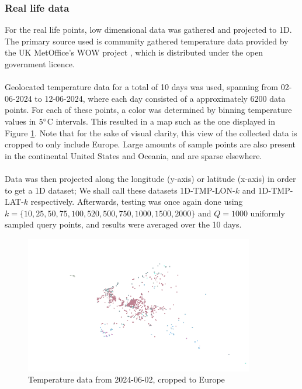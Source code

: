 \documentclass{article}
\begin{document}
\subsubsection*{Real life data}
For the real life points, low dimensional data was gathered and projected to 1D. The primary source used is community gathered temperature data provided by the UK MetOffice's WOW project \cite{Met}, which is distributed under the open government licence. \\\\
Geolocated temperature data for a total of 10 days was used, spanning from 02-06-2024 to 12-06-2024, where each day consisted of a approximately $6200$ data points. For each of these points, a color was determined by binning temperature values in $5\degree$C intervals. This resulted in a map such as the one displayed in Figure \ref{fig:temp-data}. Note that for the sake of visual clarity, this view of the collected data is cropped to only include Europe. Large amounts of sample points are also present in the continental United States and Oceania, and are sparse elsewhere. \\\\
Data was then projected along the longitude (y-axis) or latitude (x-axis) in order to get a 1D dataset; We shall call these datasets 1D-TMP-LON-$k$ and 1D-TMP-LAT-$k$ respectively. Afterwards, testing was once again done using $k=\{10, 25, 50, 75, 100, 520, 500, 750, 1000, 1500, 2000\}$ and $Q=1000$ uniformly sampled query points, and results were averaged over the 10 days.
\begin{figure}
    \centering
    \includegraphics[width=10cm]{figs/temperature-02-06-2024-cropped.png}
    \caption{Temperature data from 2024-06-02, cropped to Europe}
    \label{fig:temp-data}
\end{figure}
\end{document}

